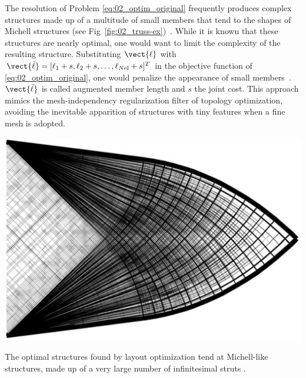 The resolution of Problem \ref{eq:02_optim_original} frequently produces complex structures made up of a multitude of small members that tend to the shapes of Michell structures (see Fig~\ref{fig:02_truss-ex})~. While it is known that these structures are nearly optimal, one would want to limit the complexity of the resulting structure. Substituting $\vect{\ell}$ with $\vect{\tilde{\ell}} = [\ell_1 + s, \ell_2 + s, \ldots,\ell_{N\text{el}} + s]^T$ in the objective function of \ref{eq:02_optim_original}, one would penalize the appearance of small members~. $\vect{\tilde{\ell}}$ is called augmented member length and $s$ the joint cost. This approach mimics the mesh-independency regularization filter of topology optimization, avoiding the inevitable apparition of structures with tiny features when a fine mesh is adopted.

\begin{marginfigure}
    \centering
    \includegraphics[width=\linewidth]{figures/02_literature/truss-ex.png}
    \caption{The optimal structures found by layout optimization tend at Michell-like structures, made up of a very large number of infinitesimal struts \cite{gilbert_layout_2003}.}
    \label{fig:02_truss-ex}
\end{marginfigure}

